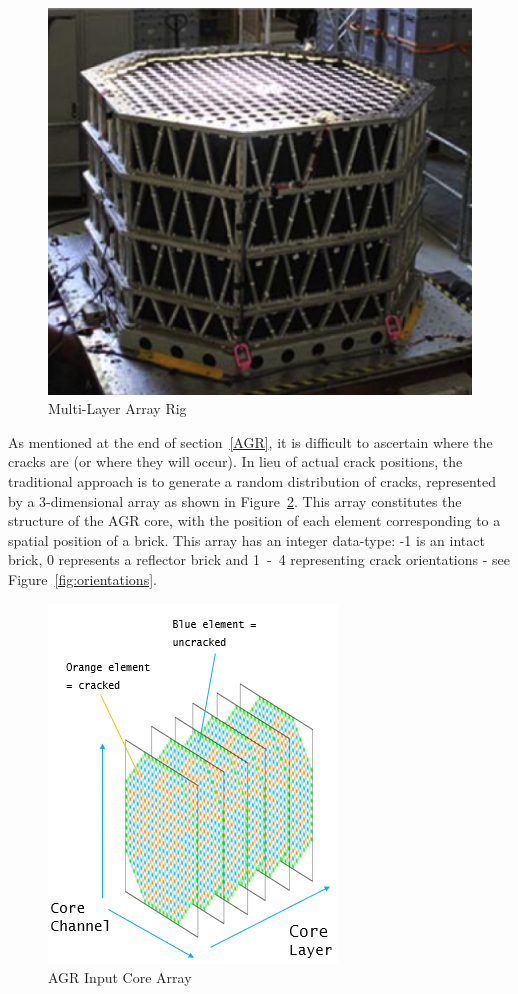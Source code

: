 \begin{figure}[b!]
	\centering
	\includegraphics[scale=0.5]{Figures/MLA_rig}
	\caption{Multi-Layer Array Rig}
	\label{fig:ENG}
\end{figure}

\noindent
As mentioned at the end of section~\ref{AGR}, it is difficult to ascertain where the cracks are (or where they will occur). In lieu of actual crack positions, the traditional approach is to generate a random distribution of cracks, represented by a 3-dimensional array as shown in Figure~\ref{fig:core_array}. This array constitutes the structure of the AGR core, with the position of each element corresponding to a spatial position of a brick. This array has an integer data-type: -1 is an intact brick, 0 represents a reflector brick and 1~-~4 representing crack orientations - see Figure~\ref{fig:orientations}. \\

\begin{figure}[ht!]
	\centering
	\includegraphics[scale=0.5]{Figures/core_array.png}
	\caption{AGR Input Core Array}
	\label{fig:core_array}
\end{figure}

